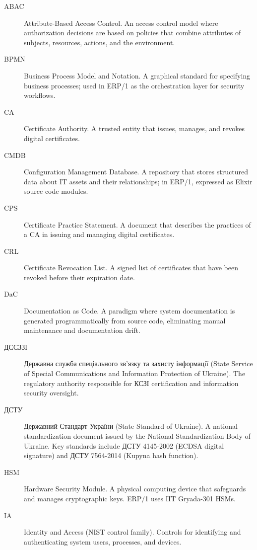 \documentclass{article}
\begin{document}
\begin{description}

    \item[ABAC] Attribute-Based Access Control. An access control model where authorization decisions are based on policies that combine attributes of subjects, resources, actions, and the environment.
    \item[BPMN] Business Process Model and Notation. A graphical standard for specifying business processes; used in ERP/1 as the orchestration layer for security workflows.
    \item[CA] Certificate Authority. A trusted entity that issues, manages, and revokes digital certificates.
    \item[CMDB] Configuration Management Database. A repository that stores structured data about IT assets and their relationships; in ERP/1, expressed as Elixir source code modules.
    \item[CPS] Certificate Practice Statement. A document that describes the practices of a CA in issuing and managing digital certificates.
    \item[CRL] Certificate Revocation List. A signed list of certificates that have been revoked before their expiration date.
    \item[DaC] Documentation as Code. A paradigm where system documentation is generated programmatically from source code, eliminating manual maintenance and documentation drift.
    \item[\foreignlanguage{ukrainian}{ДССЗЗІ}] {Державна служба спеціального зв'язку та захисту інформації} (State Service of Special Communications and Information Protection of Ukraine). The regulatory authority responsible for \foreignlanguage{ukrainian}{КСЗІ} certification and information security oversight.
    \item[\foreignlanguage{ukrainian}{ДСТУ}] {Державний Стандарт України} (State Standard of Ukraine). A national standardization document issued by the National Standardization Body of Ukraine. Key standards include \foreignlanguage{ukrainian}{ДСТУ} 4145-2002 (ECDSA digital signature) and \foreignlanguage{ukrainian}{ДСТУ} 7564-2014 (Kupyna hash function).
    \item[HSM] Hardware Security Module. A physical computing device that safeguards and manages cryptographic keys. ERP/1 uses IIT Gryada-301 HSMs.
    \item[IA] Identity and Access (NIST control family). Controls for identifying and authenticating system users, processes, and devices.

\end{description}
\end{document}

